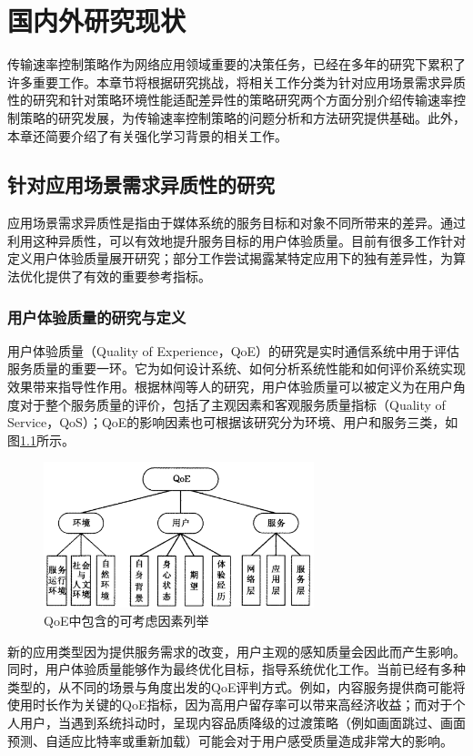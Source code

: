 
\chapter{国内外研究现状}
传输速率控制策略作为网络应用领域重要的决策任务，已经在多年的研究下累积了许多重要工作。本章节将根据研究挑战，将相关工作分类为针对应用场景需求异质性的研究和针对策略环境性能适配差异性的策略研究两个方面分别介绍传输速率控制策略的研究发展，为传输速率控制策略的问题分析和方法研究提供基础。此外，本章还简要介绍了有关强化学习背景的相关工作。

\section{针对应用场景需求异质性的研究}
应用场景需求异质性是指由于媒体系统的服务目标和对象不同所带来的差异。通过利用这种异质性，可以有效地提升服务目标的用户体验质量。目前有很多工作针对定义用户体验质量展开研究；部分工作尝试揭露某特定应用下的独有差异性，为算法优化提供了有效的重要参考指标。

\subsection{用户体验质量的研究与定义}
用户体验质量（Quality of Experience，QoE）的研究是实时通信系统中用于评估服务质量的重要一环。它为如何设计系统、如何分析系统性能和如何评价系统实现效果带来指导性作用。根据林闯\cite{林闯2012用户体验质量}等人的研究，用户体验质量可以被定义为在用户角度对于整个服务质量的评价，包括了主观因素和客观服务质量指标（Quality of Service，QoS）；QoE的影响因素也可根据该研究分为环境、用户和服务三类，如图\ref{fig:Qoedef}所示。

\begin{figure} [ht]
\centering
\includegraphics[width=0.7\textwidth]{figures/chap02/QoE.png} 
\caption{QoE中包含的可考虑因素列举\cite{林闯2012用户体验质量}}
\label{fig:Qoedef}
\end{figure}

新的应用类型因为提供服务需求的改变，用户主观的感知质量会因此而产生影响。同时，用户体验质量能够作为最终优化目标，指导系统优化工作。当前已经有多种类型的，从不同的场景与角度出发的QoE评判方式。例如，内容服务提供商可能将使用时长作为关键的QoE指标\cite{CTR洞察}，因为高用户留存率可以带来高经济收益；而对于个人用户，当遇到系统抖动时，呈现内容品质降级的过渡策略（例如画面跳过、画面预测、自适应比特率或重新加载）可能会对于用户感受质量造成非常大的影响。

